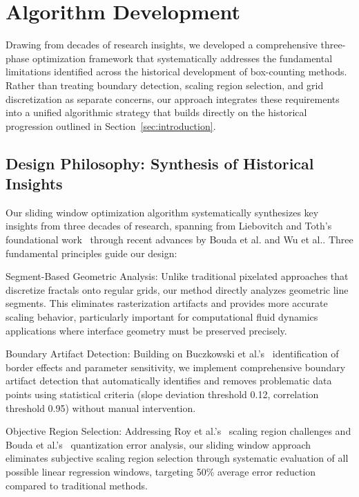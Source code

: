 \documentclass[preprint,12pt]{elsarticle}
\def\textbf#1{#1}%
\begin{document}
\section{Algorithm Development}
\label{sec:algorithm}

Drawing from decades of research insights, we developed a comprehensive three-phase optimization framework that systematically addresses the fundamental limitations identified across the historical development of box-counting methods. Rather than treating boundary detection, scaling region selection, and grid discretization as separate concerns, our approach integrates these requirements into a unified algorithmic strategy that builds directly on the historical progression outlined in Section~\ref{sec:introduction}.

\subsection{Design Philosophy: Synthesis of Historical Insights}

Our sliding window optimization algorithm systematically synthesizes key insights from three decades of research, spanning from Liebovitch and Toth's foundational work~\cite{liebovitch1989} through recent advances by Bouda et al.\cite{bouda2016} and Wu et al.\cite{wu2020}. Three fundamental principles guide our design:

\textbf{Segment-Based Geometric Analysis}: Unlike traditional pixelated approaches that discretize fractals onto regular grids, our method directly analyzes geometric line segments. This eliminates rasterization artifacts and provides more accurate scaling behavior, particularly important for computational fluid dynamics applications where interface geometry must be preserved precisely.

\textbf{Boundary Artifact Detection}: Building on Buczkowski et al.'s~\cite{buczkowski1998} identification of border effects and parameter sensitivity, we implement comprehensive boundary artifact detection that automatically identifies and removes problematic data points using statistical criteria (slope deviation threshold 0.12, correlation threshold 0.95) without manual intervention.

\textbf{Objective Region Selection}: Addressing Roy et al.'s~\cite{roy2007} scaling region challenges and Bouda et al.'s~\cite{bouda2016} quantization error analysis, our sliding window approach eliminates subjective scaling region selection through systematic evaluation of all possible linear regression windows, targeting 50\% average error reduction compared to traditional methods.
\end{document}
